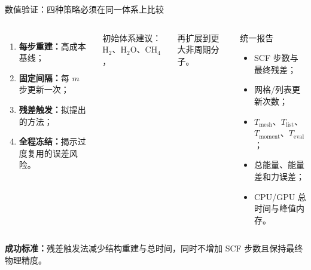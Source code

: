 \documentclass[aspectratio=169,11pt]{beamer}
\begin{document}
\begin{frame}{数值验证：四种策略必须在同一体系上比较}
  \begin{columns}[T,onlytextwidth]
      \small
      \begin{enumerate}\setlength\itemsep{0.48em}
        \item \textbf{每步重建：}高成本基线；
        \item \textbf{固定间隔：}每 $m$ 步更新一次；
        \item \textbf{残差触发：}拟提出的方法；
        \item \textbf{全程冻结：}揭示过度复用的误差风险。
      \end{enumerate}

      \vspace{0.2cm}
      初始体系建议：H$_2$、H$_2$O、CH$_4$，\par
      再扩展到更大非周期分子。
      \begin{block}{统一报告}
        \small
        \begin{itemize}\setlength\itemsep{0.38em}
          \item SCF 步数与最终残差；
          \item 网格/列表更新次数；
          \item $T_{\mathrm{mesh}}$、$T_{\mathrm{list}}$、$T_{\mathrm{moment}}$、$T_{\mathrm{eval}}$；
          \item 总能量、能量差和力误差；
          \item CPU/GPU 总时间与峰值内存。
        \end{itemize}
      \end{block}
  \end{columns}

  \vspace{0.25cm}
  \centering
  \textbf{成功标准：}残差触发法减少结构重建与总时间，同时不增加 SCF 步数且保持最终物理精度。
\end{frame}
\end{document}
